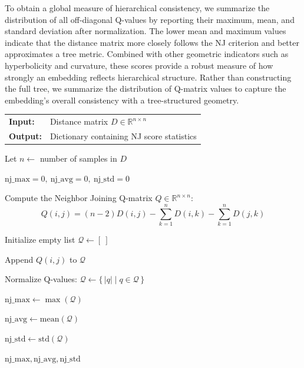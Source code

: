 \documentclass[]{Liebert_Author_revised}
\begin{document}
To obtain a global measure of hierarchical consistency, we summarize the distribution of all off-diagonal Q-values by reporting their maximum, mean, and standard deviation after normalization. The lower mean and maximum values indicate that the distance matrix more closely follows the NJ criterion and better approximates a tree metric. Combined with other geometric indicators such as hyperbolicity and curvature, these scores provide a robust measure of how strongly an embedding reflects hierarchical structure. Rather than constructing the full tree, we summarize the distribution of Q-matrix values to capture the embedding's overall consistency with a tree-structured geometry.

\begin{algorithm}[h]
\caption{Neighbor Joining–Based Tree-Likeness Scoring}
\label{alg_nj_scores}
\noindent
\small
\begin{tabular}{p{1cm}p{7cm}}
\textbf{Input:}  & Distance matrix \(D \in \mathbb{R}^{n \times n}\) \\
\textbf{Output:} & Dictionary containing NJ score statistics
\end{tabular}

\begin{algorithmic}[1]{}

\STATE Let \(n \leftarrow\) number of samples in \(D\)

    \RETURN \(\text{nj\_max} = 0,\ \text{nj\_avg} = 0,\ \text{nj\_std} = 0\)
\ENDIF

\STATE Compute the Neighbor Joining Q-matrix \(Q \in \mathbb{R}^{n \times n}\):
\[
Q(i,j) = (n-2)D(i,j) - \sum_{k=1}^{n} D(i,k) - \sum_{k=1}^{n} D(j,k)
\]

\STATE Initialize empty list \(\mathcal{Q} \leftarrow [ \ ]\)

        \STATE Append \(Q(i,j)\) to \(\mathcal{Q}\)
    \ENDFOR
\ENDFOR

\STATE Normalize Q-values: \(\mathcal{Q} \leftarrow \{\, |q| \mid q \in \mathcal{Q} \,\}\)

\STATE \(\text{nj\_max} \leftarrow \max(\mathcal{Q})\)

\STATE \(\text{nj\_avg} \leftarrow \text{mean}(\mathcal{Q})\)

\STATE \(\text{nj\_std} \leftarrow \text{std}(\mathcal{Q})\)

\RETURN \(\text{nj\_max}, \text{nj\_avg}, \text{nj\_std}\)

\end{algorithmic}
\end{algorithm}
\end{document}
